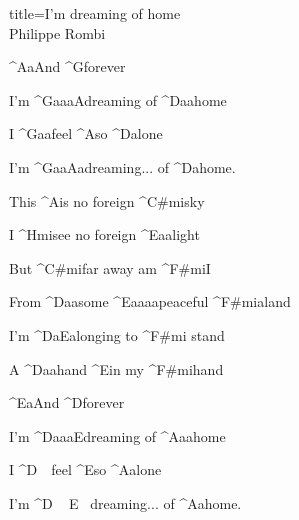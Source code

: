 \begin{song}{title=\predtitle\centering I'm dreaming of home \\\large Philippe Rombi \vspace*{-0.3cm}}
\begin{centerjustified}
\begin{varwidth}[t]{0.55\textwidth}
	^{A{\color{white}a}}And ^{G}forever

	I'm ^{G{\color{white}aaa}A}dreaming of ^{D{\color{white}aa}}home

	I ^{G{\color{white}aa}}feel ^{A}so ^{D}alone

	I'm ^{G{\color{white}aa}A{\color{white}a}}dreaming... of ^{D{\color{white}a}}home.


\sloka
	This ^{A}is no foreign  ^{C#mi}sky

	I ^{Hmi}see no foreign ^{E{\color{white}aa}}light

	But  ^{C#mi}far away am ^{F#mi}I

	From ^{D{\color{white}aa}}some ^{E{\color{white}aaaa}}peaceful  ^{F#mi{\color{white}a}}land

	I'm ^{D{\color{white}a}E{\color{white}a}}longing to ^{F#mi\,\,}stand

	A ^{D{\color{white}aa}}hand ^{E}in my  ^{F#mi}hand

	 ^{E{\color{white}a}}And ^{D}forever

	I'm ^{D{\color{white}aaa}E}dreaming of ^{A{\color{white}aa}}home

	I ^{D\,\,\,\,\,\,}feel ^{E}so ^{A}alone

	I'm ^{D\,\,\,\,\,\,\,E\,\,\,\,\,}dreaming... of ^{A{\color{white}a}}home.

\end{varwidth}   %
\end{centerjustified}
\setcounter{Slokočet}{0}
\end{song}

